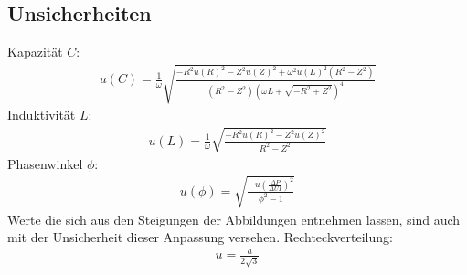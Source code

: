 \subsection{Unsicherheiten}\label{kap:Unsich}
Kapazität $C$:
\begin{align*}
	u(C)=\frac{1}{\omega} \sqrt{\frac{- R^{2} u(R)^{2} - Z^{2} u(Z)^{2} + \omega^2 u(L)^{2} \left(R^{2} - Z^{2}\right)}{\left(R^{2} - Z^{2}\right) \left(\omega L + \sqrt{- R^{2} + Z^{2}}\right)^{4}}}	
\end{align*}
Induktivität $L$:
\begin{align*}
	u(L)=\frac{1}{\omega} \sqrt{\frac{- R^{2} u(R)^{2} - Z^{2} u(Z)^{2}}{R^{2} - Z^{2}}}
\end{align*}
Phasenwinkel $\phi$: 
\begin{align*}
	u(\phi)=\sqrt{\frac{-u\left(\frac{\Delta P}{\Delta UI}\right)^2}{\phi^2-1}}
\end{align*}
Werte die sich aus  den Steigungen der Abbildungen entnehmen lassen, sind auch mit der Unsicherheit dieser Anpassung versehen.
Rechteckverteilung:
\begin{align}
	u=\frac{a}{2\sqrt{3}}\label{eq:sur}
\end{align}
